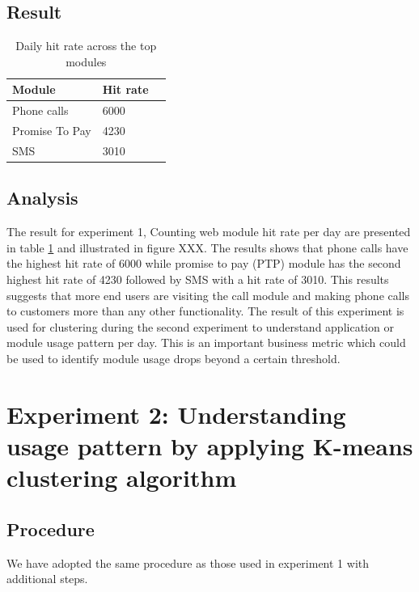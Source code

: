 \documentclass[12pt, letterpaper, titlepage]{report}
\begin{document}
\subsection{Result} 

\begin{table}[h!]
	\centering
	
	
	\begin{tabular}{|l|l|l|}
		\hline
		\textbf{Module} & \textbf{Hit rate} \\ \hline
		Phone calls        & 6000                        \\ \hline
		Promise To Pay        & 4230                        \\ \hline
		SMS        & 3010                        \\ \hline
	\end{tabular}
	\caption{Daily hit rate across the top modules}
	\label{hit rate}
\end{table}

\subsection{Analysis}

The result for experiment 1, Counting web module hit rate per day are presented in table \ref{hit rate} and illustrated in figure XXX. The results shows that phone calls have the highest hit rate of 6000 while promise to pay (PTP) module has the second highest hit rate of 4230 followed by SMS with a hit rate of 3010. This results suggests that more end users are visiting the call module and making phone calls to customers more than any other functionality. The result of this experiment is used for clustering during the second experiment to understand application or module usage pattern per day. This is an important business metric which could be used to identify module usage drops beyond a certain threshold.

\section{Experiment 2: Understanding usage pattern by applying K-means clustering algorithm}

\subsection{Procedure}
We have adopted the same procedure as those used in experiment 1 with additional steps.
\end{document}
